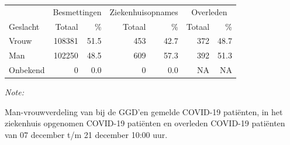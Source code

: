 \documentclass[
  english,
  man,floatsintext]{apa6}
\begin{document}
\begin{table}
\centering\begingroup\fontsize{11}{13}\selectfont

\begin{threeparttable}
\begin{tabular}{lrrrrrr}
\toprule
\multicolumn{1}{c}{ } & \multicolumn{2}{c}{Besmettingen} & \multicolumn{2}{c}{Ziekenhuisopnames} & \multicolumn{2}{c}{Overleden} \\
\cmidrule(l{3pt}r{3pt}){2-3} \cmidrule(l{3pt}r{3pt}){4-5} \cmidrule(l{3pt}r{3pt}){6-7}
Geslacht & Totaal & \% & Totaal & \% & Totaal & \%\\
\midrule
Vrouw & 108381 & 51.5 & 453 & 42.7 & 372 & 48.7\\
Man & 102250 & 48.5 & 609 & 57.3 & 392 & 51.3\\
Onbekend & 0 & 0.0 & 0 & 0.0 & NA & NA\\
\bottomrule
\end{tabular}
\begin{tablenotes}
\item \textit{Note: } 
\item Man-vrouwverdeling van bij de GGD’en gemelde COVID-19 patiënten, in het ziekenhuis opgenomen COVID-19 patiënten en overleden COVID-19 patiënten van 07 december t/m 21 december 10:00 uur.
\end{tablenotes}
\end{threeparttable}
\endgroup{}
\end{table}
\newpage
\end{document}
